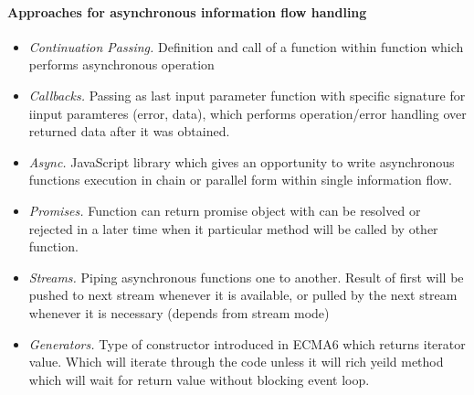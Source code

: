 \paragraph{Approaches for asynchronous information flow handling}
\begin{itemize}
	\item \textit{Continuation Passing.} Definition and call of a function within function which performs asynchronous operation
	\item \textit{Callbacks.} Passing as last input parameter function with specific signature for iinput paramteres (error, data), which performs operation/error handling over returned data after it was obtained.
	\item \textit{Async.} JavaScript library which gives an opportunity to write asynchronous functions execution in chain or parallel form within single information flow.
	\item \textit{Promises.} Function can return promise object with can be resolved or rejected in a later time when it particular method will be called by other function.
	\item\textit{Streams.} Piping asynchronous functions one to another. Result of first will be pushed to next stream whenever it is available, or pulled by the next stream whenever it is necessary (depends from stream mode)
	\item\textit{Generators.} Type of constructor introduced in ECMA6 which returns iterator value. Which will iterate through the code unless it will rich yeild method which will wait for return value without blocking event loop.

\end{itemize}
